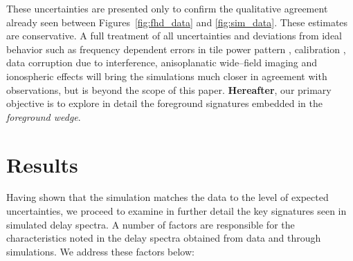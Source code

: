 \documentclass[preprint2,iop,numberedappendix]{emulateapj}
\begin{document}
These uncertainties are presented only to confirm the qualitative agreement already seen between Figures~\ref{fig:fhd_data} and \ref{fig:sim_data}. These estimates are conservative. A full treatment of all uncertainties and deviations from ideal behavior such as frequency dependent errors in tile power pattern \citep{ber15}, calibration \citep{dat10}, data corruption due to interference, anisoplanatic wide--field imaging and ionospheric effects \citep{int09} will bring the simulations much closer in agreement with observations, but is beyond the scope of this paper. {\bf Hereafter}, our primary objective is to explore in detail the foreground signatures embedded in the {\it foreground wedge}.

\section{Results}\label{sec:delay-spectrum-analysis}

Having shown that the simulation matches the data to the level of expected uncertainties, we proceed to examine in further detail the key signatures seen in simulated delay spectra. A number of factors are responsible for the characteristics noted in the delay spectra obtained from data and through simulations. We address these factors below: 
\end{document}
